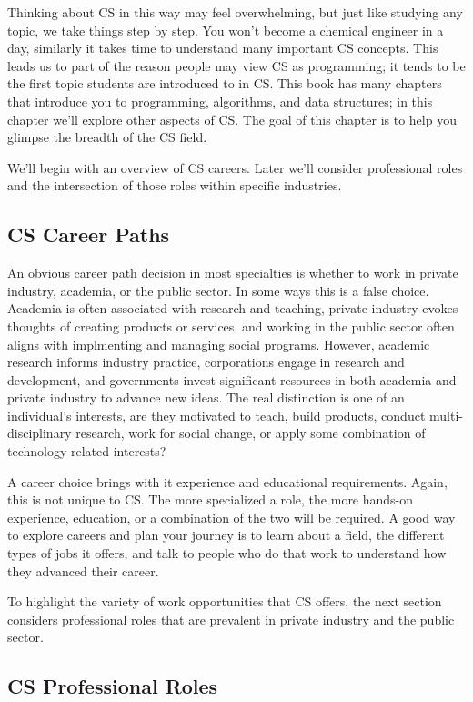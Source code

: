 Thinking about CS in this way may feel overwhelming, but just like studying any topic, we take things step by step. You won't become a chemical engineer in a day, similarly it takes time to understand many important CS concepts. This leads us to part of the reason people may view CS as programming; it tends to be the first topic students are introduced to in CS. This book has many chapters that introduce you to programming, algorithms, and data structures; in this chapter we'll explore other aspects of CS. The goal of this chapter is to help you glimpse the breadth of the CS field.

We'll begin with an overview of CS careers. Later we'll consider professional roles and the intersection of those roles within specific industries.

\subsection{CS Career Paths}

An obvious career path decision in most specialties is whether to work in private industry, academia, or the public sector. In some ways this is a false choice. Academia is often associated with research and teaching, private industry evokes thoughts of creating products or services, and working in the public sector often aligns with implmenting and managing social programs. However, academic research informs industry practice, corporations engage in research and development, and governments invest significant resources in both academia and private industry to advance new ideas. The real distinction is one of an individual's interests, are they motivated to teach, build products, conduct multi-disciplinary research, work for social change, or apply some combination of technology-related interests?

A career choice brings with it experience and educational requirements. Again, this is not unique to CS. The more specialized a role, the more hands-on experience, education, or a combination of the two will be required. A good way to explore careers and plan your journey is to learn about a field, the different types of jobs it offers, and talk to people who do that work to understand how they advanced their career. 

To highlight the variety of work opportunities that CS offers, the next section considers professional roles that are prevalent in private industry and the public sector. 

\subsection{CS Professional Roles}

